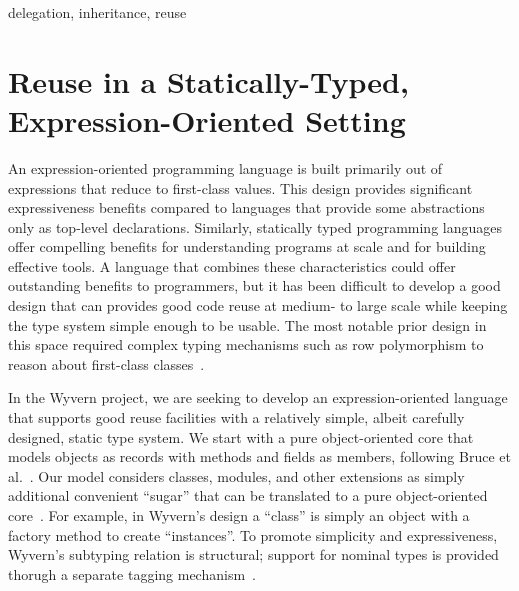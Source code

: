 \documentclass[preprint]{sigplanconf}
\begin{document}

%

\keywords
delegation, inheritance, reuse

\section{Reuse in a Statically-Typed, Expression-Oriented Setting}

An expression-oriented programming language is built primarily out of
expressions that reduce to first-class values.  This design provides
significant expressiveness benefits compared to languages that provide
some abstractions only as top-level declarations.  Similarly, statically
typed programming languages offer compelling benefits for understanding
programs at scale and for building effective tools.  A language that
combines these characteristics could offer outstanding benefits to
programmers, but it has been difficult to develop a good design that
can provides good code reuse at medium- to large scale while keeping
the type system simple enough to be usable.  The most notable prior
design in this space required complex typing mechanisms such as row
polymorphism to reason about first-class classes~\cite{TSDTF}.


In the Wyvern project, we are seeking to develop an expression-oriented
language that supports good reuse facilities with a relatively simple,
albeit carefully designed, static type system.  We start with a pure
object-oriented core that models objects as records with methods and
fields as members, following Bruce et al.~\cite{BCP99}. Our model
considers classes, modules, and other extensions as simply additional
convenient ``sugar'' that can be translated to a pure object-oriented
core~\cite{Nistor:2013:WST:2489828.2489830}.  For example, in Wyvern's
design a ``class'' is simply an object with a factory method to create
``instances''.  To promote simplicity and expressiveness, Wyvern's
subtyping relation is structural; support for nominal types is
provided thorugh a separate tagging
mechanism~\cite{DBLP:conf/ecoop/LeeASP15}.
\end{document}
